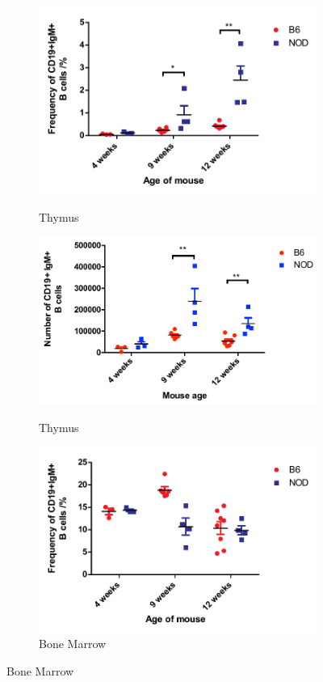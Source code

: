 \begin{figure}
	\begin{subfigure}{0.5\textwidth}
	\caption{Thymus}
	\includegraphics[width=\textwidth]{Figures/IncthyBcells.pdf}	
	\label{subfig:IncthyBcells}
	\end{subfigure}
	\begin{subfigure}{0.5\textwidth}
	\caption{Thymus}
	\includegraphics[width=\textwidth]{Figures/NumbersofBcells.pdf}
	\label{subfig:ThyBcellnumbers}
	\end{subfigure}
	\begin{subfigure}{0.5\textwidth}
	\caption{Bone Marrow}
	\includegraphics[width=\textwidth]{Figures/BMBcells.pdf}

\end{subfigure}
\end{figure}
